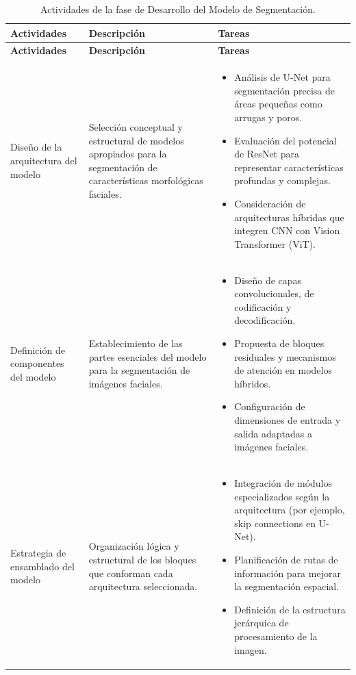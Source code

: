  \vspace{2ex}
 \begingroup
 \renewcommand\arraystretch{1.2}
 \begin{longtable}{>{\raggedright\arraybackslash}p{4cm} >{\raggedright\arraybackslash}p{4cm} >{\raggedright\arraybackslash}p{5cm}}
 \caption{Actividades de la fase de Desarrollo del Modelo de Segmentación.}
 \label{tabla:actividades_segmentacion}\\
 \toprule
 \textbf{Actividades} & \textbf{Descripción} & \textbf{Tareas} \\
 \midrule
 \endfirsthead
 
 \toprule
 \textbf{Actividades} & \textbf{Descripción} & \textbf{Tareas} \\
 \midrule
 \endhead
 
 \bottomrule
 \endfoot
 
 Diseño de la arquitectura del modelo & Selección conceptual y estructural de modelos apropiados para la segmentación de características morfológicas faciales. &
 \begin{itemize}
     \item Análisis de U-Net para segmentación precisa de áreas pequeñas como arrugas y poros.
     \item Evaluación del potencial de ResNet para representar características profundas y complejas.
     \item Consideración de arquitecturas híbridas que integren CNN con Vision Transformer (ViT).
 \end{itemize} \\
 
 Definición de componentes del modelo & Establecimiento de las partes esenciales del modelo para la segmentación de imágenes faciales. &
 \begin{itemize}
     \item Diseño de capas convolucionales, de codificación y decodificación.
     \item Propuesta de bloques residuales y mecanismos de atención en modelos híbridos.
     \item Configuración de dimensiones de entrada y salida adaptadas a imágenes faciales.
 \end{itemize} \\
 
 Estrategia de ensamblado del modelo & Organización lógica y estructural de los bloques que conforman cada arquitectura seleccionada. &
 \begin{itemize}
     \item Integración de módulos especializados según la arquitectura (por ejemplo, skip connections en U-Net).
     \item Planificación de rutas de información para mejorar la segmentación espacial.
     \item Definición de la estructura jerárquica de procesamiento de la imagen.
 \end{itemize} \\
 
 \end{longtable}
 \endgroup

